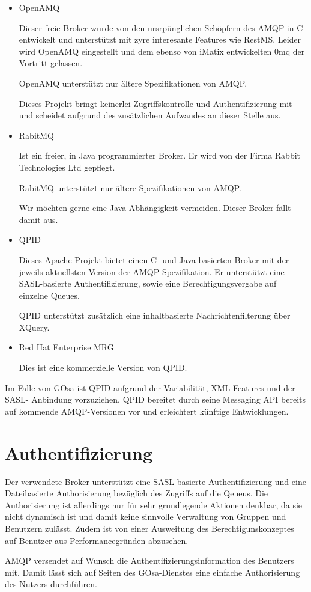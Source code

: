 \begin{itemize}
\item OpenAMQ

  Dieser freie Broker wurde von den ursrpünglichen Schöpfern des AMQP in C entwickelt und
  unterstützt mit zyre interesante Features wie RestMS. Leider wird OpenAMQ
  eingestellt und dem ebenso von iMatix entwickelten 0mq der Vortritt gelassen.

  OpenAMQ unterstützt nur ältere Spezifikationen von AMQP.

  Dieses Projekt bringt keinerlei Zugriffskontrolle und Authentifizierung mit
  und scheidet aufgrund des zusätzlichen Aufwandes an dieser Stelle aus.

\item RabitMQ

  Ist ein freier, in Java programmierter Broker. Er wird von der Firma
  Rabbit Technologies Ltd gepflegt.

  RabitMQ unterstützt nur ältere Spezifikationen von AMQP.

  Wir möchten gerne eine Java-Abhängigkeit vermeiden. Dieser Broker fällt
  damit aus.

\item QPID

  Dieses Apache-Projekt bietet einen C- und Java-basierten Broker mit der
  jeweils aktuellsten Version der AMQP-Spezifikation. Er unterstützt eine
  SASL-basierte Authentifizierung, sowie eine Berechtigungsvergabe auf
  einzelne Queues.

  QPID unterstützt zusätzlich eine inhaltbasierte Nachrichtenfilterung über XQuery.


\item Red Hat Enterprise MRG

  Dies ist eine kommerzielle Version von QPID.
\end{itemize}


Im Falle von GOsa ist QPID aufgrund der Variabilität, XML-Features und der SASL-
Anbindung vorzuziehen. QPID bereitet durch seine Messaging API bereits auf
kommende AMQP-Versionen vor und erleichtert künftige Entwicklungen. 


\section{Authentifizierung}

Der verwendete Broker unterstützt eine SASL-basierte Authentifizierung und
eine Dateibasierte Authorisierung bezüglich des Zugriffs auf die Qeueus. Die
Authorisierung ist allerdings nur für sehr grundlegende Aktionen denkbar, da
sie nicht dynamisch ist und damit keine sinnvolle Verwaltung von Gruppen und
Benutzern zulässt. Zudem ist von einer Ausweitung des Berechtigunskonzeptes auf
Benutzer aus Performancegründen abzusehen.

AMQP versendet auf Wunsch die Authentifizierungsinformation des Benutzers
mit. Damit lässt sich auf Seiten des GOsa-Dienstes eine einfache Authorisierung
des Nutzers durchführen.

